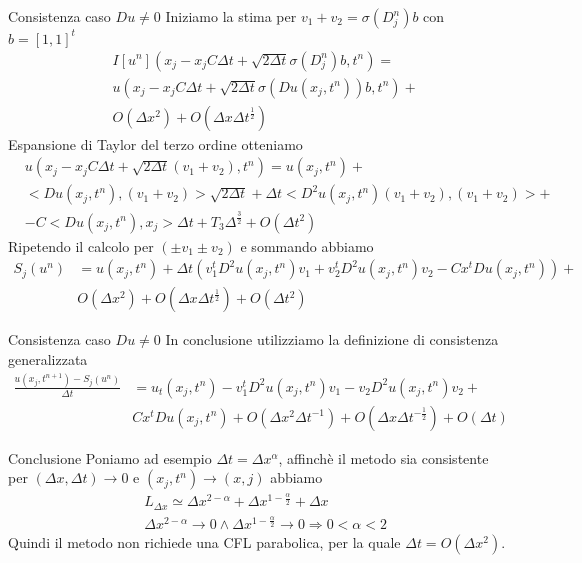 \begin{frame}{Consistenza caso $Du\neq 0$}
Iniziamo la stima per \alert{$v_1+v_2=\sigma(D_j^n)b$} con $b=[1,1]^t$
\[
\begin{aligned}
  &I[u^n](x_j-x_jC\Delta t +\sqrt{2\Delta t}\sigma(D_j^n)b,t^n)=\\
  &u(x_j-x_jC\Delta t +\sqrt{2\Delta t}\sigma(Du(x_j,t^n))b,t^n)+\\
  &O(\Delta x^2) + O(\Delta x\Delta t^{\frac{1}{2}}) 
\end{aligned}
\]
Espansione di Taylor del terzo ordine otteniamo
\[
\begin{aligned}
&u(x_j-x_jC\Delta t +\sqrt{2\Delta
    t}(v_1+v_2),t^n)=u(x_j,t^n)+\\
&<Du(x_j,t^n),(v_1+v_2)>\sqrt{2\Delta t}+\Delta
  t<D^2u(x_j,t^n)(v_1+v_2),(v_1+v_2)>+\\
&-C<Du(x_j,t^n),x_j>\Delta t+T_3\Delta^{\frac{3}{2}} +O(\Delta t^2)
\end{aligned}
\]
Ripetendo il calcolo per $(\pm v_1\pm v_2)$ e sommando abbiamo
\[
\begin{aligned}
S_j(u^n)&=u(x_j,t^n)+\Delta t(v_1^tD^2u(x_j,t^n)v_1+v_2^tD^2u(x_j,t^n)v_2-Cx^tDu(x_j,t^n))+\\
&O(\Delta x^2)+ O(\Delta x\Delta t^{\frac{1}{2}})+ O(\Delta t^2)
\end{aligned}
\]
\end{frame}

\begin{frame}{Consistenza caso $Du\neq 0$}
In conclusione utilizziamo la definizione di consistenza generalizzata
\[
\begin{aligned}
\frac{u(x_j,t^{n+1})-S_j(u^n)}{\Delta
  t}&=u_t(x_j,t^n)-v_1^tD^2u(x_j,t^n)v_1-v_2D^2u(x_j,t^n)v_2+\\
& Cx^tDu(x_j,t^n)+O(\Delta x^2\Delta t^{-1})+O(\Delta x\Delta
t^{-\frac{1}{2}})+O(\Delta t)
\end{aligned}
\]
\begin{alertblock}{Conclusione}
Poniamo ad esempio $\Delta t=\Delta x^{\alpha}$, affinchè il metodo
sia consistente per $(\Delta x,\Delta t)\to 0$ e $(x_j,t^n)\to (x,j)$
abbiamo 
\[
\begin{aligned}
&L_{\Delta x}\simeq\Delta x^{2-\alpha}+\Delta
x^{1-\frac{\alpha}{2}}+\Delta x \\
&\Delta x^{2-\alpha}\to 0\land\Delta x^{1-\frac{\alpha}{2}}\to 0\Rightarrow0<\alpha<2
\end{aligned}
\]
Quindi il metodo non richiede una CFL parabolica, per la quale
$\Delta t=O(\Delta x^2)$.
\end{alertblock}
\end{frame}

